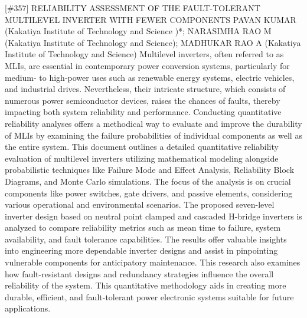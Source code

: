 {} \begin{abstract_online} {[\#357] RELIABILITY ASSESSMENT OF THE  FAULT-TOLERANT MULTILEVEL  INVERTER WITH FEWER COMPONENTS} {} {PAVAN KUMAR (Kakatiya Institute of Technology and Science )*; NARASIMHA RAO M (Kakatiya Institute of Technology and Science); MADHUKAR RAO A (Kakatiya Institute of Technology and Science)} {} Multilevel inverters, often referred to as MLIs, are essential in contemporary power conversion systems, particularly for medium- to high-power uses such as renewable energy systems, electric vehicles, and industrial drives. Nevertheless, their intricate structure, which consists of numerous power semiconductor devices, raises the chances of faults, thereby impacting both system reliability and performance. Conducting quantitative reliability analyses offers a methodical way to evaluate and improve the durability of MLIs by examining the failure probabilities of individual components as well as the entire system. This document outlines a detailed quantitative reliability evaluation of multilevel inverters utilizing mathematical modeling alongside probabilistic techniques like Failure Mode and Effect Analysis, Reliability Block Diagrams, and Monte Carlo simulations. The focus of the analysis is on crucial components like power switches, gate drivers, and passive elements, considering various operational and environmental scenarios. The proposed seven-level inverter design based on neutral point clamped and cascaded H-bridge inverters is analyzed to compare reliability metrics such as mean time to failure, system availability, and fault tolerance capabilities. The results offer valuable insights into engineering more dependable inverter designs and assist in pinpointing vulnerable components for anticipatory maintenance. This research also examines how fault-resistant designs and redundancy strategies influence the overall reliability of the system. This quantitative methodology aids in creating more durable, efficient, and fault-tolerant power electronic systems suitable for future applications. \end{abstract_online} 
